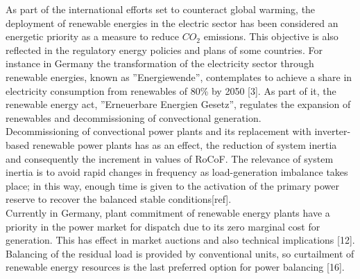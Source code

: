 
  As part of the international efforts set to counteract global warming, the deployment of renewable energies in the electric sector has been considered an energetic priority as a measure to reduce $CO_{2}$ emissions. This objective is also reflected in the regulatory energy policies and plans of some countries. For instance in Germany the transformation of the electricity sector through renewable energies, known as ''Energiewende”, contemplates to achieve a share in electricity consumption from renewables of 80\% by 2050 [3]. As part of it, the renewable energy act, ''Erneuerbare Energien Gesetz”, regulates the expansion of renewables and decommissioning of convectional generation. \\
    
 Decommissioning of convectional power plants and its replacement with inverter-based renewable power plants has as an effect, the reduction of system inertia and consequently the increment in values of RoCoF. The relevance of system inertia is to avoid rapid changes in frequency as load-generation imbalance takes place; in this way, enough time is given to the activation of the primary power reserve to recover the balanced stable conditions[ref].\\ %
 Currently in Germany, plant commitment of renewable energy plants have a priority in the power market for dispatch due to its zero marginal cost for generation. This has effect in market auctions and also technical implications [12]. Balancing of the residual load is provided by conventional units, so curtailment of renewable energy resources is the last preferred option for power balancing [16].\\
   
